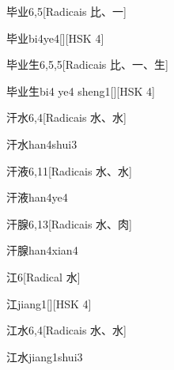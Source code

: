 \begin{entry}{毕业}{6,5}[Radicais ⽐、⼀]
  \begin{phonetics}{毕业}{bi4ye4}[][HSK 4]
  \end{phonetics}
\end{entry}

\begin{entry}{毕业生}{6,5,5}[Radicais ⽐、⼀、⽣]
  \begin{phonetics}{毕业生}{bi4 ye4 sheng1}[][HSK 4]
  \end{phonetics}
\end{entry}

\begin{entry}{汗水}{6,4}[Radicais ⽔、⽔]
  \begin{phonetics}{汗水}{han4shui3}
  \end{phonetics}
\end{entry}

\begin{entry}{汗液}{6,11}[Radicais ⽔、⽔]
  \begin{phonetics}{汗液}{han4ye4}
  \end{phonetics}
\end{entry}

\begin{entry}{汗腺}{6,13}[Radicais ⽔、⾁]
  \begin{phonetics}{汗腺}{han4xian4}
  \end{phonetics}
\end{entry}

\begin{entry}{江}{6}[Radical ⽔]
  \begin{phonetics}{江}{jiang1}[][HSK 4]
  \end{phonetics}
\end{entry}

\begin{entry}{江水}{6,4}[Radicais ⽔、⽔]
  \begin{phonetics}{江水}{jiang1shui3}
  \end{phonetics}
\end{entry}

